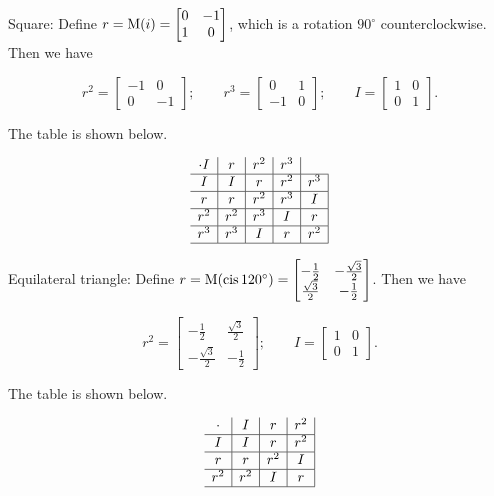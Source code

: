 \documentclass[../key.tex]{subfiles}
\begin{document}
Square: Define $r=\operatorname{M}(i) = \begin{bmatrix} 0 & -1 \\ 1 & 0 \end{bmatrix}$, which is a rotation $90^\circ$ counterclockwise. Then we have

$$r^2 = \begin{bmatrix} -1 & 0 \\ 0 & -1 \end{bmatrix};\qquad r^3 = \begin{bmatrix} 0 & 1 \\ -1 & 0 \end{bmatrix};\qquad I = \begin{bmatrix} 1 & 0 \\ 0 & 1 \end{bmatrix}.$$

The table is shown below.

$$\begin{array}{c|c|c|c|c|}
\cdot I & r & r^2 & r^3 \\ \hline
I & I & r & r^2 & r^3 \\ \hline
r & r & r^2 & r^3 & I \\ \hline
r^2 & r^2 & r^3 & I & r \\ \hline
r^3 & r^3 & I & r & r^2 \\ \hline
\end{array}$$

Equilateral triangle: Define $r=\operatorname{M}(\operatorname{cis} 120^\circ)=\begin{bmatrix} -\frac{1}{2} & -\frac{\sqrt{3}}{2} \\ \frac{\sqrt{3}}{2} & -\frac{1}{2}\end{bmatrix}$. Then we have

$$r^2 = \begin{bmatrix} -\frac{1}{2} & \frac{\sqrt{3}}{2} \\ -\frac{\sqrt{3}}{2} & -\frac{1}{2}\end{bmatrix};\qquad I = \begin{bmatrix} 1 & 0 \\ 0 & 1 \end{bmatrix}.$$

The table is shown below.

$$\begin{array}{c|c|c|c|}
\cdot & I & r & r^2 \\ \hline
I & I & r & r^2 \\ \hline
r & r & r^2 & I \\ \hline
r^2 & r^2 & I & r \\ \hline
\end{array}$$
\end{document}
